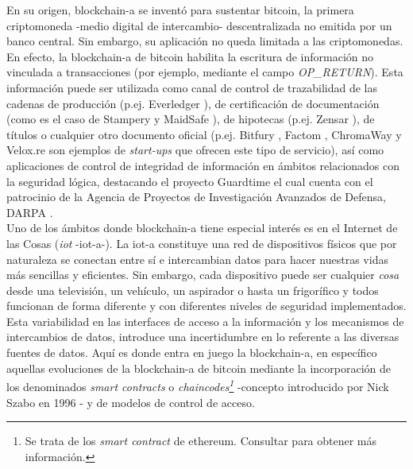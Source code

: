 \documentclass[12pt,a4paper, twoside]{report}
\begin{document}
	En su origen, \gls{blockchain-a} se inventó para sustentar \gls{bitcoin}, la primera criptomoneda -medio digital de intercambio- descentralizada no emitida por un banco central. Sin embargo, su aplicación no queda limitada a las criptomonedas. En efecto, la \gls{blockchain-a} de \gls{bitcoin} habilita la escritura de información no vinculada a transacciones (por ejemplo, mediante el campo \textit{OP\_RETURN}). Esta información puede ser utilizada como canal de control de trazabilidad de las cadenas de producción (p.ej. Everledger \cite{everledger}), de certificación de documentación (como es el caso de Stampery \cite{stampery} y MaidSafe \cite{maidsafe}), de hipotecas (p.ej. Zensar \cite{zensar}), de títulos o cualquier otro documento oficial (p.ej. Bitfury \cite{bitfury}, Factom \cite{factom}, ChromaWay \cite{chromaway} y Velox.re \cite{velox} son ejemplos de \textit{start-ups} que ofrecen este tipo de servicio), así como aplicaciones de control de integridad de información en ámbitos relacionados con la seguridad lógica, destacando el proyecto Guardtime \cite{guardtime} el cual cuenta con el patrocinio de la Agencia de Proyectos de Investigación Avanzados de Defensa, DARPA \cite{darpa}. \\

	Uno de los ámbitos donde \gls{blockchain-a} tiene especial interés es en el Internet de las Cosas (\textit{\gls{iot}} -\gls{iot-a}-). La \gls{iot-a} constituye una red de dispositivos físicos que por naturaleza se conectan entre sí e intercambian datos para hacer nuestras vidas más sencillas y eficientes. Sin embargo, cada dispositivo puede ser cualquier \textit{cosa} desde una televisión, un vehículo, un aspirador o hasta un frigorífico y todos funcionan de forma diferente y con diferentes niveles de seguridad implementados. Esta variabilidad en las interfaces de acceso a la información y los mecanismos de intercambios de datos, introduce una incertidumbre en lo referente a las diversas fuentes de datos. Aquí es donde entra en juego la \gls{blockchain-a}, en específico aquellas evoluciones de la \gls{blockchain-a} de \gls{bitcoin} mediante la incorporación de los denominados \textit{smart contracts} o \textit{\glspl{chaincode}\footnote{Se trata de los \textit{smart contract} de \gls{ethereum}. Consultar \cite{ethereum} para obtener más información.}} -concepto introducido por Nick Szabo en 1996 \cite{szabo:1997:FSRPN}- y de modelos de control de acceso.	\\
	
\end{document}
